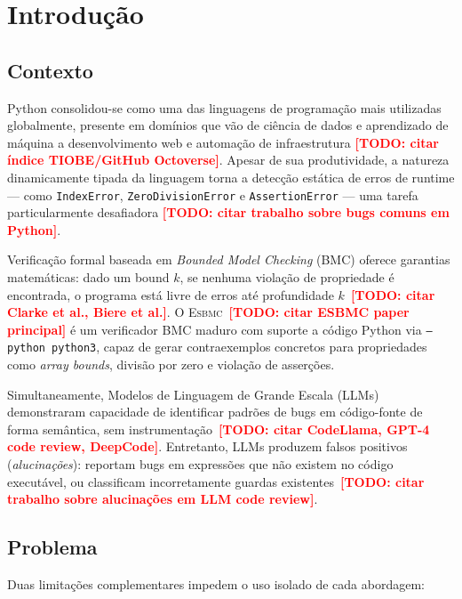 \documentclass[conference]{IEEEtran}
\newcommand{\esbmc}{\textsc{Esbmc}}
\newcommand{\todo}[1]{\textcolor{red}{\textbf{[TODO: #1]}}}
\begin{document}
\section{Introdução}
\label{sec:introducao}

\subsection{Contexto}
\label{sec:contexto}

Python consolidou-se como uma das linguagens de programação mais utilizadas
globalmente, presente em domínios que vão de ciência de dados e aprendizado
de máquina a desenvolvimento web e automação de infraestrutura
\todo{citar índice TIOBE/GitHub Octoverse}.
Apesar de sua produtividade, a natureza dinamicamente tipada da linguagem
torna a detecção estática de erros de runtime — como
\texttt{IndexError}, \texttt{ZeroDivisionError} e \texttt{AssertionError}
— uma tarefa particularmente desafiadora
\todo{citar trabalho sobre bugs comuns em Python}.

Verificação formal baseada em \textit{Bounded Model Checking} (BMC)
oferece garantias matemáticas: dado um bound $k$, se nenhuma violação
de propriedade é encontrada, o programa está livre de erros até
profundidade $k$~\todo{citar Clarke et al., Biere et al.}.
O \esbmc{}~\todo{citar ESBMC paper principal} é um verificador BMC maduro
com suporte a código Python via \texttt{--python python3}, capaz de gerar
contraexemplos concretos para propriedades como \textit{array bounds},
divisão por zero e violação de asserções.

Simultaneamente, Modelos de Linguagem de Grande Escala (LLMs) demonstraram
capacidade de identificar padrões de bugs em código-fonte de forma
semântica, sem instrumentação~\todo{citar CodeLlama, GPT-4 code review,
DeepCode}.
Entretanto, LLMs produzem falsos positivos (\textit{alucinações}): reportam
bugs em expressões que não existem no código executável, ou classificam
incorretamente guardas existentes~\todo{citar trabalho sobre alucinações
em LLM code review}.

\subsection{Problema}
\label{sec:problema}

Duas limitações complementares impedem o uso isolado de cada abordagem:
\end{document}
